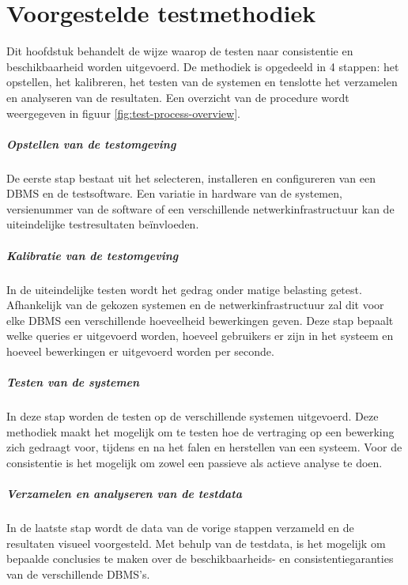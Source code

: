 \chapter{Voorgestelde testmethodiek }	\label{sec:methodiekvantesten}
Dit hoofdstuk behandelt de wijze waarop de testen naar consistentie en beschikbaarheid worden uitgevoerd. 
De methodiek is opgedeeld in 4 stappen: het opstellen, het kalibreren, het testen van de systemen en tenslotte het verzamelen en analyseren van de resultaten. Een overzicht van de procedure wordt weergegeven in figuur \ref{fig:test-process-overview}.

\paragraph{Opstellen van de testomgeving} De eerste stap bestaat uit het selecteren, installeren en configureren van een DBMS en de testsoftware. Een variatie in hardware van de systemen, versienummer van de software of een verschillende netwerkinfrastructuur kan de uiteindelijke testresultaten beïnvloeden. 

\paragraph{Kalibratie van de testomgeving} In de uiteindelijke testen wordt het gedrag onder matige belasting getest. Afhankelijk van de gekozen systemen en de netwerkinfrastructuur zal dit voor elke DBMS een verschillende hoeveelheid bewerkingen geven. Deze stap bepaalt welke queries er uitgevoerd worden, hoeveel gebruikers er zijn in het systeem en hoeveel bewerkingen er uitgevoerd worden per seconde. 

\paragraph{Testen van de systemen} In deze stap worden de testen op de verschillende systemen uitgevoerd. Deze methodiek maakt het mogelijk om te testen hoe de vertraging op een bewerking zich gedraagt voor, tijdens en na het falen en herstellen van een systeem. Voor de consistentie is het mogelijk om zowel een passieve als actieve analyse te doen. 

\paragraph{Verzamelen en analyseren van de testdata} In de laatste stap wordt de data van de vorige stappen verzameld en de resultaten visueel voorgesteld. Met behulp van de testdata, is het mogelijk om bepaalde conclusies te maken over de beschikbaarheids- en consistentiegaranties van de verschillende DBMS's. 

